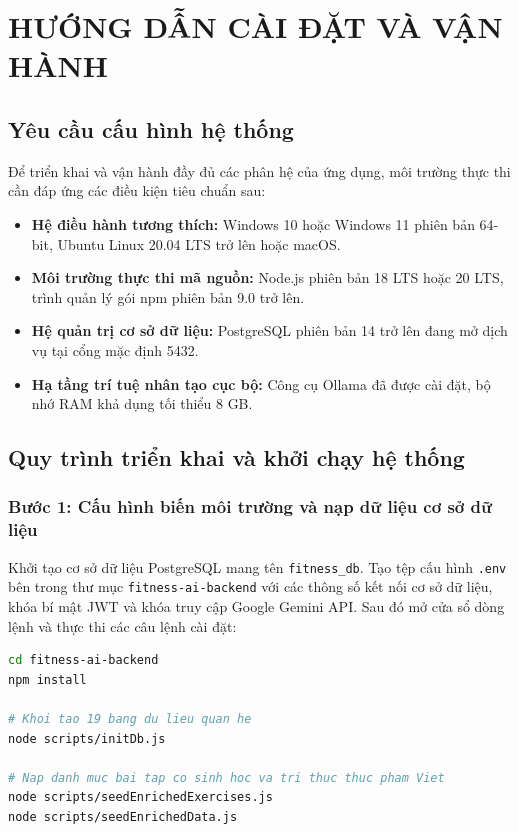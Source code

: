 
\chapter{HƯỚNG DẪN CÀI ĐẶT VÀ VẬN HÀNH}
\label{app:installation}

\section{Yêu cầu cấu hình hệ thống}

Để triển khai và vận hành đầy đủ các phân hệ của ứng dụng, môi trường thực thi cần đáp ứng các điều kiện tiêu chuẩn sau:
\begin{itemize}[leftmargin=1.5cm]
    \item \textbf{Hệ điều hành tương thích:} Windows 10 hoặc Windows 11 phiên bản 64-bit, Ubuntu Linux 20.04 LTS trở lên hoặc macOS.
    \item \textbf{Môi trường thực thi mã nguồn:} Node.js phiên bản 18 LTS hoặc 20 LTS, trình quản lý gói npm phiên bản 9.0 trở lên.
    \item \textbf{Hệ quản trị cơ sở dữ liệu:} PostgreSQL phiên bản 14 trở lên đang mở dịch vụ tại cổng mặc định 5432.
    \item \textbf{Hạ tầng trí tuệ nhân tạo cục bộ:} Công cụ Ollama đã được cài đặt, bộ nhớ RAM khả dụng tối thiểu 8 GB.
\end{itemize}

\section{Quy trình triển khai và khởi chạy hệ thống}

\subsection{Bước 1: Cấu hình biến môi trường và nạp dữ liệu cơ sở dữ liệu}
Khởi tạo cơ sở dữ liệu PostgreSQL mang tên \texttt{fitness\_db}. Tạo tệp cấu hình \texttt{.env} bên trong thư mục \texttt{fitness-ai-backend} với các thông số kết nối cơ sở dữ liệu, khóa bí mật JWT và khóa truy cập Google Gemini API. Sau đó mở cửa sổ dòng lệnh và thực thi các câu lệnh cài đặt:

\begin{lstlisting}[language=bash, caption={Lệnh cài đặt gói phụ thuộc và nạp dữ liệu nền tảng cho máy chủ}]
cd fitness-ai-backend
npm install

# Khoi tao 19 bang du lieu quan he
node scripts/initDb.js

# Nap danh muc bai tap co sinh hoc va tri thuc thuc pham Viet
node scripts/seedEnrichedExercises.js
node scripts/seedEnrichedData.js
\end{lstlisting}


